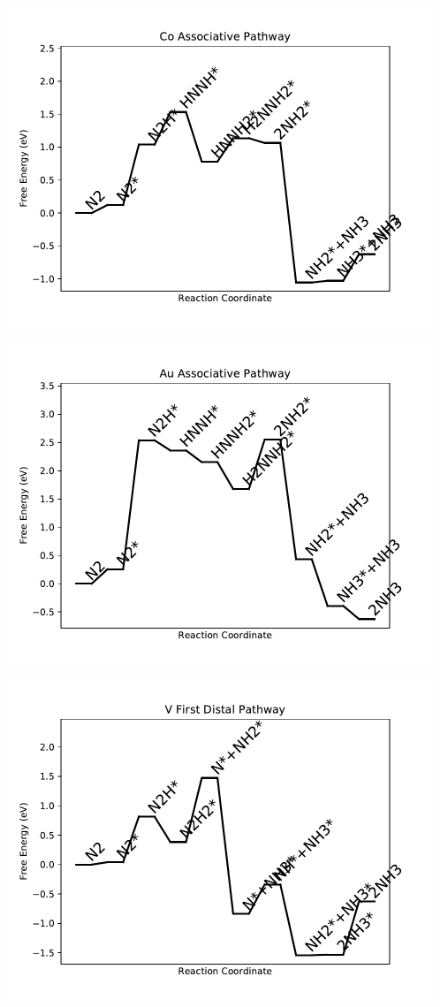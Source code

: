 \begin{figure}
\includegraphics[width=0.8\linewidth]{data/plots/Co_associative.pdf}
\label{fig:Co_associative}
\end{figure}

\begin{figure}
\includegraphics[width=0.8\linewidth]{data/plots/Au_associative.pdf}
\label{fig:Au_associative}
\end{figure}

\begin{figure}
\includegraphics[width=0.8\linewidth]{data/plots/V_distal_1.pdf}
\label{fig:V_distal_1}
\end{figure}

